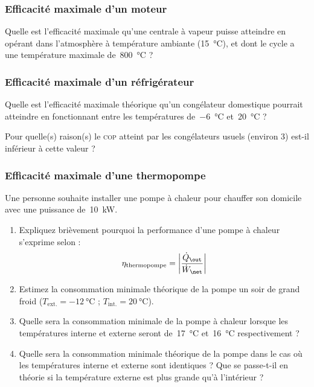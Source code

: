 \begin{boiboiboite}
	\propeau
	\propair
	\isentropiques
	\isothermes
	\efficacitescarnot
\end{boiboiboite}


\subsubsection{Efficacité maximale d’un moteur}
\label{exo_efficacite_moteur_carnot}

	Quelle est l’efficacité maximale qu’une centrale à vapeur puisse atteindre en opérant dans l’atmosphère à température ambiante (\SI{15}{\degreeCelsius}), et dont le cycle a une température maximale de~\SI{800}{\degreeCelsius} ?

\subsubsection{Efficacité maximale d’un réfrigérateur}
\label{exo_efficacite_refrigerateur_carnot}

	Quelle est l’efficacité maximale théorique qu’un congélateur domestique pourrait atteindre en fonctionnant entre les températures de~\SI{-6}{\degreeCelsius} et~\SI{20}{\degreeCelsius} ?
	
	Pour quelle(s) raison(s) le \textsc{cop} atteint par les congélateurs usuels (environ \num{3}) est-il inférieur à cette valeur ?
	
\subsubsection{Efficacité maximale d’une thermopompe}
\label{exo_efficacite_thermopompe_carnot}

	Une personne souhaite installer une pompe à chaleur pour chauffer son domicile avec une puissance de~\SI{10}{\kilo\watt}.

	\begin{enumerate}
	
		\item Expliquez brièvement pourquoi la performance d’une pompe à chaleur s’exprime selon :
			\begin{equation}
				\eta_\text{thermopompe} = \left| \frac{\dot Q_\out}{\dot W_\net} \right|
			\end{equation}

		\item Estimez la consommation minimale théorique de la pompe un soir de grand froid ($T_\text{ext.} = \SI{-12}{\degreeCelsius}$ ; $T_\text{int.} = \SI{20}{\degreeCelsius}$).
		
		\item Quelle sera la consommation minimale de la pompe à chaleur lorsque les températures interne et externe seront de~\SI{17}{\degreeCelsius}  et~\SI{16}{\degreeCelsius} respectivement ?
		
		\item Quelle sera la consommation minimale théorique de la pompe dans le cas où les températures interne et externe sont identiques ?  Que se passe-t-il en théorie si la température externe est plus grande qu’à l’intérieur ?

	\end{enumerate}


